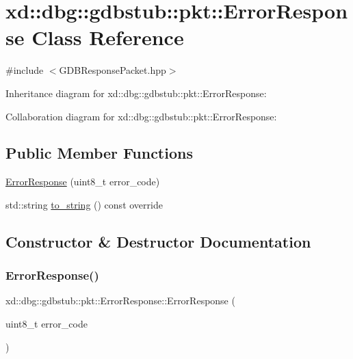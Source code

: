 \hypertarget{classxd_1_1dbg_1_1gdbstub_1_1pkt_1_1_error_response}{}\section{xd\+:\+:dbg\+:\+:gdbstub\+:\+:pkt\+:\+:Error\+Response Class Reference}
\label{classxd_1_1dbg_1_1gdbstub_1_1pkt_1_1_error_response}


{\ttfamily \#include $<$G\+D\+B\+Response\+Packet.\+hpp$>$}



Inheritance diagram for xd\+:\+:dbg\+:\+:gdbstub\+:\+:pkt\+:\+:Error\+Response\+:


Collaboration diagram for xd\+:\+:dbg\+:\+:gdbstub\+:\+:pkt\+:\+:Error\+Response\+:
\subsection*{Public Member Functions}
\begin{DoxyCompactItemize}
\item 
\mbox{\hyperlink{classxd_1_1dbg_1_1gdbstub_1_1pkt_1_1_error_response_a2346bb37d029f6a4681aad61c4d8fd1f}{Error\+Response}} (uint8\+\_\+t error\+\_\+code)
\item 
std\+::string \mbox{\hyperlink{classxd_1_1dbg_1_1gdbstub_1_1pkt_1_1_error_response_aed320a810c6fcf51d67f4d5db4454f61}{to\+\_\+string}} () const override
\end{DoxyCompactItemize}


\subsection{Constructor \& Destructor Documentation}
\mbox{\label{classxd_1_1dbg_1_1gdbstub_1_1pkt_1_1_error_response_a2346bb37d029f6a4681aad61c4d8fd1f}} 
\subsubsection{\texorpdfstring{Error\+Response()}{ErrorResponse()}}
{\footnotesize\ttfamily xd\+::dbg\+::gdbstub\+::pkt\+::\+Error\+Response\+::\+Error\+Response (\begin{DoxyParamCaption}\item[{uint8\+\_\+t}]{error\+\_\+code }\end{DoxyParamCaption})\hspace{0.3cm}{\ttfamily [inline]}}



